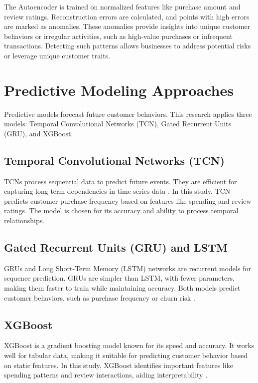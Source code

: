 \documentclass[12pt, a4paper,twoside]{report}
\theoremstyle{plain} %
\theoremstyle{definition} %
\theoremstyle{remark} %
\numberwithin{equation}{chapter}
\begin{document}
The Autoencoder is trained on normalized features like purchase amount and review ratings. Reconstruction errors are calculated, and points with high errors are marked as anomalies. These anomalies provide insights into unique customer behaviors or irregular activities, such as high-value purchases or infrequent transactions. Detecting such patterns allows businesses to address potential risks or leverage unique customer traits.



\section{Predictive Modeling Approaches}

Predictive models forecast future customer behaviors. This research applies three models: Temporal Convolutional Networks (TCN), Gated Recurrent Units (GRU), and XGBoost.

\subsection{Temporal Convolutional Networks (TCN)}

TCNs process sequential data to predict future events. They are efficient for capturing long-term dependencies in time-series data \cite{oord2016wavenet}. In this study, TCN predicts customer purchase frequency based on features like spending and review ratings. The model is chosen for its accuracy and ability to process temporal relationships.

\subsection{Gated Recurrent Units (GRU) and LSTM}

GRUs and Long Short-Term Memory (LSTM) networks are recurrent models for sequence prediction. GRUs are simpler than LSTM, with fewer parameters, making them faster to train while maintaining accuracy. Both models predict customer behaviors, such as purchase frequency or churn risk \cite{cho2014gru}.

\subsection{XGBoost}

XGBoost is a gradient boosting model known for its speed and accuracy. It works well for tabular data, making it suitable for predicting customer behavior based on static features. In this study, XGBoost identifies important features like spending patterns and review interactions, aiding interpretability \cite{chen2016xgboost}.
\end{document}

